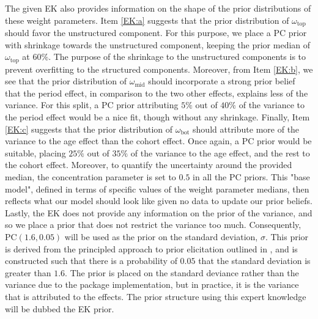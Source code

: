 The given EK also provides information on the shape of the prior distributions of these weight parameters. Item \ref{EK:a} suggests that the prior distribution of $\omega_{\text{top}}$ should favor the unstructured component. For this purpose, we place a PC prior with shrinkage towards the unstructured component, keeping the prior median of $\omega_{\text{top}}$ at $60\%$. The purpose of the shrinkage to the unstructured components is to prevent overfitting to the structured components. Moreover, from Item \ref{EK:b}, we see that the prior distribution of $\omega_{\text{mid}}$ should incorporate a strong prior belief that the period effect, in comparison to the two other effects, explains less of the variance. For this split, a PC prior attributing $5\%$ out of $40\%$ of the variance to the period effect would be a nice fit, though without any shrinkage. Finally, Item \ref{EK:c} suggests that the prior distribution of $\omega_{\text{bot}}$ should attribute more of the variance to the age effect than the cohort effect. Once again, a PC prior would be suitable, placing $25\%$ out of $35\%$ of the variance to the age effect, and the rest to the cohort effect. Moreover, to quantify the uncertainty around the provided median, the concentration parameter is set to $0.5$ in all the PC priors. This "base model", defined in terms of specific values of the weight parameter medians, then reflects what our model should look like given no data to update our prior beliefs. Lastly, the EK does not provide any information on the prior of the variance, and so we place a prior that does not restrict the variance too much. Consequently, $\text{PC}(1.6,0.05)$ will be used as the prior on the standard deviation, $\sigma$. This prior is derived from the principled approach to prior elicitation outlined in \cite{PC-priors}, and is constructed such that there is a probability of $0.05$ that the standard deviation is greater than $1.6$. The prior is placed on the standard deviance rather than the variance due to the package implementation, but in practice, it is the variance that is attributed to the effects. The prior structure using this expert knowledge will be dubbed the EK prior. 

